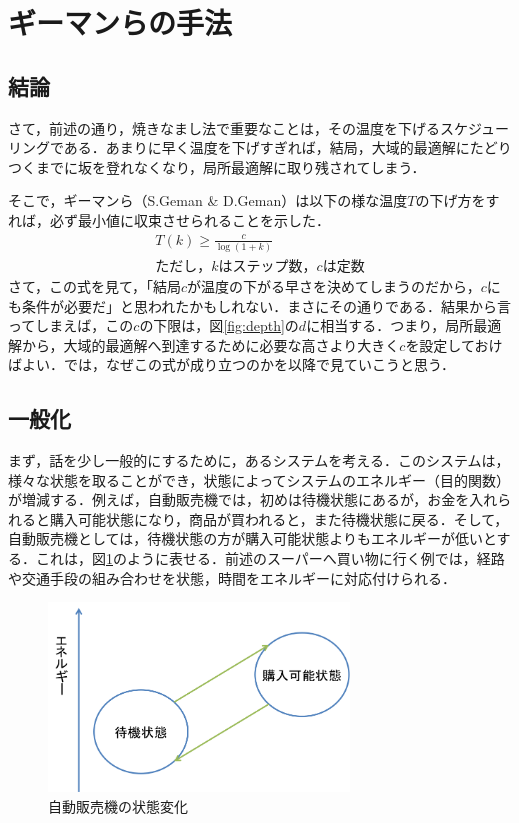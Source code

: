 \documentclass{jarticle}
\begin{document}
\section{ギーマンらの手法}

\subsection{結論}
さて，前述の通り，焼きなまし法で重要なことは，その温度を下げるスケジューリングである．あまりに早く温度を下げすぎれば，結局，大域的最適解にたどりつくまでに坂を登れなくなり，局所最適解に取り残されてしまう．

そこで，ギーマンら（S.Geman \& D.Geman）は以下の様な温度$T$の下げ方をすれば，必ず最小値に収束させられることを示した．
\begin{eqnarray}
	\label{eq:geman}
	T(k) \ge \frac{c}{\log (1+k)}\\
	ただし，kはステップ数，cは定数\nonumber
\end{eqnarray}
さて，この式を見て，「結局$c$が温度の下がる早さを決めてしまうのだから，$c$にも条件が必要だ」と思われたかもしれない．まさにその通りである．結果から言ってしまえば，この$c$の下限は，図\ref{fig:depth}の$d$に相当する．つまり，局所最適解から，大域的最適解へ到達するために必要な高さより大きく$c$を設定しておけばよい．では，なぜこの式が成り立つのかを以降で見ていこうと思う．


\subsection{一般化}
まず，話を少し一般的にするために，あるシステムを考える．このシステムは，様々な状態を取ることができ，状態によってシステムのエネルギー（目的関数）が増減する．例えば，自動販売機では，初めは待機状態にあるが，お金を入れられると購入可能状態になり，商品が買われると，また待機状態に戻る．そして，自動販売機としては，待機状態の方が購入可能状態よりもエネルギーが低いとする．これは，図\ref{fig:auto}のように表せる．前述のスーパーへ買い物に行く例では，経路や交通手段の組み合わせを状態，時間をエネルギーに対応付けられる．

\begin{figure}[H]
\begin{center}
	\includegraphics[width=80mm]{image/auto.png}
	\caption{自動販売機の状態変化}
	\label{fig:auto}
\end{center}
\end{figure}
\end{document}
